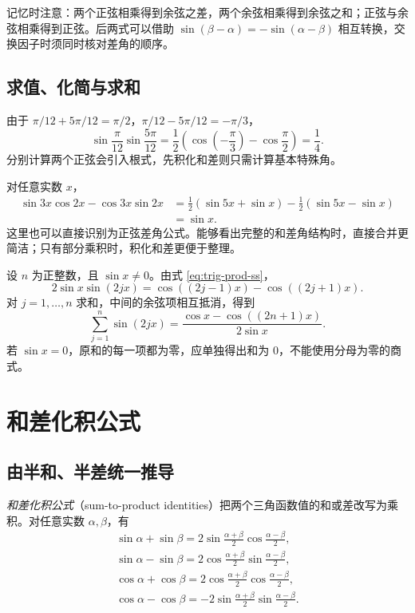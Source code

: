 \documentclass[UTF8,12pt,a4paper,fontset=fandol]{ctexart}
\begin{document}
记忆时注意：两个正弦相乘得到余弦之差，两个余弦相乘得到余弦之和；正弦与余弦相乘得到正弦。后两式可以借助 $\sin(\beta-\alpha)=-\sin(\alpha-\beta)$ 相互转换，交换因子时须同时核对差角的顺序。

\subsection{求值、化简与求和}

\begin{example}[乘积求值]
由于 $\pi/12+5\pi/12=\pi/2$，$\pi/12-5\pi/12=-\pi/3$，
\[
  \sin\frac\pi{12}\sin\frac{5\pi}{12}
  =\frac12\left(\cos\left(-\frac\pi3\right)-\cos\frac\pi2\right)
  =\frac14.
\]
分别计算两个正弦会引入根式，先积化和差则只需计算基本特殊角。
\end{example}

\begin{example}[消去中间频率]
对任意实数 $x$，
\begin{align*}
  \sin3x\cos2x-\cos3x\sin2x
  &=\frac12(\sin5x+\sin x)-\frac12(\sin5x-\sin x)\\
  &=\sin x.
\end{align*}
这里也可以直接识别为正弦差角公式。能够看出完整的和差角结构时，直接合并更简洁；只有部分乘积时，积化和差更便于整理。
\end{example}

\begin{example}[乘积形式的有限和]
设 $n$ 为正整数，且 $\sin x\ne0$。由式 \eqref{eq:trig-prod-ss}，
\[
  2\sin x\sin(2jx)=\cos((2j-1)x)-\cos((2j+1)x).
\]
对 $j=1,\ldots,n$ 求和，中间的余弦项相互抵消，得到
\[
  \sum_{j=1}^{n}\sin(2jx)
  =\frac{\cos x-\cos((2n+1)x)}{2\sin x}.
\]
若 $\sin x=0$，原和的每一项都为零，应单独得出和为 $0$，不能使用分母为零的商式。
\end{example}

\section{和差化积公式}
\label{sec:trig-sum-to-product}

\subsection{由半和、半差统一推导}

\emph{和差化积公式}（sum-to-product identities）把两个三角函数值的和或差改写为乘积。对任意实数 $\alpha,\beta$，有
\begin{align}
  \boxed{\sin\alpha+\sin\beta
  =2\sin\frac{\alpha+\beta}{2}\cos\frac{\alpha-\beta}{2}},\label{eq:trig-sum-ss}\\
  \boxed{\sin\alpha-\sin\beta
  =2\cos\frac{\alpha+\beta}{2}\sin\frac{\alpha-\beta}{2}},\label{eq:trig-diff-ss}\\
  \boxed{\cos\alpha+\cos\beta
  =2\cos\frac{\alpha+\beta}{2}\cos\frac{\alpha-\beta}{2}},\label{eq:trig-sum-cc}\\
  \boxed{\cos\alpha-\cos\beta
  =-2\sin\frac{\alpha+\beta}{2}\sin\frac{\alpha-\beta}{2}}.\label{eq:trig-diff-cc}
\end{align}
\end{document}
